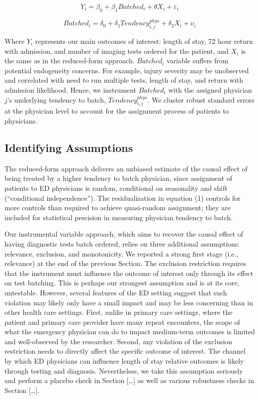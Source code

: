 \documentclass{article}
\begin{document}
\begin{equation}
Y_i = \beta_0 + \beta_1 Batched_i + \theta X_i + \varepsilon_i
\end{equation}

\begin{equation}
Batched_i = \delta_0 + \delta_1 Tendency_{i,j}^{phys} + \delta_2 X_i + \nu_i
\end{equation}

Where \(Y_i\) represents our main outcomes of interest: length of stay,
72 hour return with admission, and number of imaging tests ordered for
the patient, and \(X_i\) is the same as in the reduced-form approach.
\(Batched_i\) variable suffers from potential endogeneity concerns. For
example, injury severity may be unobserved and correlated with need to
run multiple tests, length of stay, and return with admission
likelihood. Hence, we instrument \(Batched_i\) with the assigned
physician \(j\)'s underlying tendency to batch,
\(Tendency_{i,j}^{phys}\). We cluster robust standard errors at the
physician level to account for the assignment process of patients to
physicians.

\hypertarget{identifying-assumptions}{%
\subsection{Identifying Assumptions}\label{identifying-assumptions}}

The reduced-form approach delivers an unbiased estimate of the causal
effect of being treated by a higher tendency to batch physician, since
assignment of patients to ED physicians is random, conditional on
seasonality and shift (``conditional independence''). The
residualization in equation (1) controls for more controls than required
to achieve quasi-random assignment; they are included for statistical
precision in measuring physician tendency to batch.

Our instrumental variable approach, which aims to recover the causal
effect of having diagnostic tests batch ordered, relies on three
additional assumptions: relevance, exclusion, and monotonicity. We
reported a strong first stage (i.e., relevance) at the end of the
previous Section. The exclusion restriction requires that the instrument
must influence the outcome of interest only through its effect on test
batching. This is perhaps our strongest assumption and is at its core,
untestable. However, several features of the ED setting suggest that
such violation may likely only have a small impact and may be less
concerning than in other health care settings. First, unlike in primary
care settings, where the patient and primary care provider have many
repeat encounters, the scope of what the emergency physician can do to
impact medium-term outcomes is limited and well-observed by the
researcher. Second, any violation of the exclusion restriction needs to
directly affect the specific outcome of interest. The channel by which
ED physicians can influence length of stay relative outcomes is likely
through testing and diagnosis. Nevertheless, we take this assumption
seriously and perform a placebo check in Section {[}\ldots{]} as well as
various robustness checks in Section {[}\ldots{]}.
\end{document}
